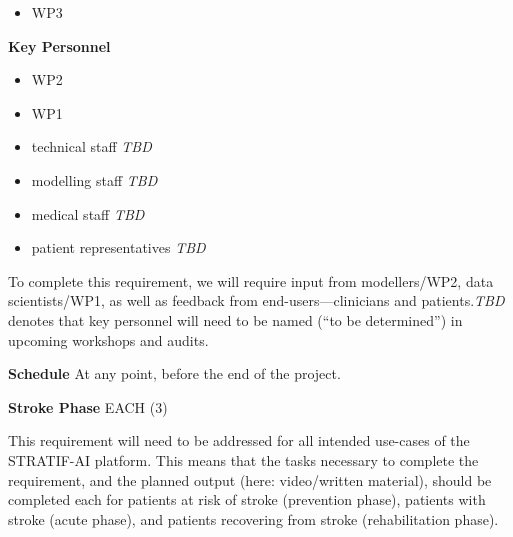 \documentclass[
  letterpaper,
  DIV=11,
  numbers=noendperiod]{scrreport}
\providecommand{\tightlist}{%
  \setlength{\itemsep}{0pt}\setlength{\parskip}{0pt}}\usepackage{longtable,booktabs,array}
\begin{document}
\begin{itemize}
\tightlist
\item
  WP3
\end{itemize}

\textbf{Key Personnel}

\begin{itemize}
\tightlist
\item
  WP2
\item
  WP1
\item
  technical staff \emph{TBD}
\item
  modelling staff \emph{TBD}
\item
  medical staff \emph{TBD}
\item
  patient representatives \emph{TBD}
\end{itemize}

\begin{tcolorbox}[enhanced jigsaw, arc=.35mm, breakable, coltitle=black, toptitle=1mm, colbacktitle=quarto-callout-tip-color!10!white, toprule=.15mm, left=2mm, bottomrule=.15mm, opacitybacktitle=0.6, titlerule=0mm, colback=white, opacityback=0, title=\textcolor{quarto-callout-tip-color}{\faLightbulb}\hspace{0.5em}{Tip}, bottomtitle=1mm, colframe=quarto-callout-tip-color-frame, leftrule=.75mm, rightrule=.15mm]

To complete this requirement, we will require input from modellers/WP2,
data scientists/WP1, as well as feedback from end-users---clinicians and
patients.\emph{TBD} denotes that key personnel will need to be named
(``to be determined'') in upcoming workshops and audits.

\end{tcolorbox}

\textbf{Schedule} At any point, before the end of the project.

\textbf{Stroke Phase} EACH (3)

\begin{tcolorbox}[enhanced jigsaw, arc=.35mm, breakable, coltitle=black, toptitle=1mm, colbacktitle=quarto-callout-tip-color!10!white, toprule=.15mm, left=2mm, bottomrule=.15mm, opacitybacktitle=0.6, titlerule=0mm, colback=white, opacityback=0, title=\textcolor{quarto-callout-tip-color}{\faLightbulb}\hspace{0.5em}{Tip}, bottomtitle=1mm, colframe=quarto-callout-tip-color-frame, leftrule=.75mm, rightrule=.15mm]

This requirement will need to be addressed for all intended use-cases of
the STRATIF-AI platform. This means that the tasks necessary to complete
the requirement, and the planned output (here: video/written material),
should be completed each for patients at risk of stroke (prevention
phase), patients with stroke (acute phase), and patients recovering from
stroke (rehabilitation phase).

\end{tcolorbox}
\end{document}
